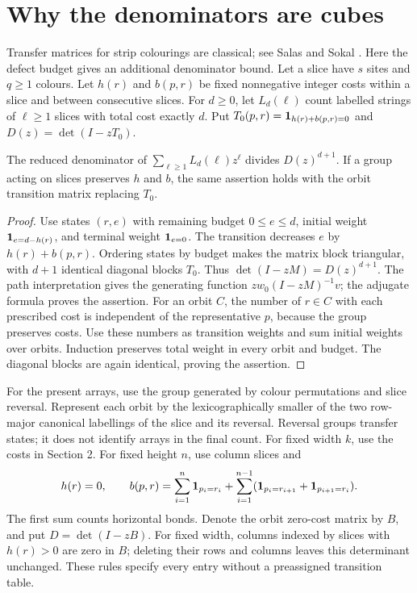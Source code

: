 \section{Why the denominators are cubes}
Transfer matrices for strip colourings are classical; see Salas and
Sokal \cite[Section 3]{salassokal}. Here the defect budget gives an
additional denominator bound.
Let a slice have $s$ sites and $q\geq1$ colours. Let $h(r)$ and
$b(p,r)$ be fixed nonnegative integer costs within a slice and between
consecutive slices. For $d\geq0$, let $L_d(\ell)$ count labelled
strings of $\ell\geq1$ slices with total cost exactly $d$.
Put $T_0(p,r)=\mathbf{1}_{h(r)+b(p,r)=0}$ and $D(z)=\det(I-zT_0)$.
\begin{theorem}\label{thm:budget}
The reduced denominator of $\sum_{\ell\geq1}L_d(\ell)z^\ell$ divides
$D(z)^{d+1}$. If a group acting on slices preserves $h$ and $b$, the
same assertion holds with the orbit transition matrix replacing $T_0$.
\end{theorem}
\begin{proof}
Use states $(r,e)$ with remaining budget $0\leq e\leq d$, initial
weight $\mathbf{1}_{e=d-h(r)}$, and terminal weight $\mathbf{1}_{e=0}$.
The transition decreases $e$ by $h(r)+b(p,r)$. Ordering states by
budget makes the matrix block triangular, with $d+1$ identical
diagonal blocks $T_0$. Thus $\det(I-zM)=D(z)^{d+1}$.
The path interpretation gives the generating function
$z w_0(I-zM)^{-1}v$; the adjugate formula proves the assertion.
For an orbit $C$, the number of $r\in C$ with each prescribed cost
is independent of the representative $p$, because the group preserves
costs. Use these numbers as transition weights and sum initial weights
over orbits. Induction preserves total weight in every orbit and
budget. The diagonal blocks are again identical, proving the assertion.
\end{proof}

For the present arrays, use the group generated by colour permutations
and slice reversal. Represent each orbit by the lexicographically
smaller of the two row-major canonical labellings of the slice and its
reversal. Reversal groups transfer states; it does not identify arrays
in the final count. For fixed width $k$, use the costs in Section 2.
For fixed height $n$, use column slices and
\[
h(r)=0,\qquad b(p,r)=\sum_{i=1}^{n}\mathbf{1}_{p_i=r_i}
+\sum_{i=1}^{n-1}(\mathbf{1}_{p_i=r_{i+1}}+\mathbf{1}_{p_{i+1}=r_i}).
\]
The first sum counts horizontal bonds. Denote the orbit zero-cost
matrix by $B$, and put $D=\det(I-zB)$. For fixed width, columns
indexed by slices with $h(r)>0$ are zero in $B$; deleting their rows
and columns leaves this determinant unchanged. These rules specify
every entry without a preassigned transition table.

